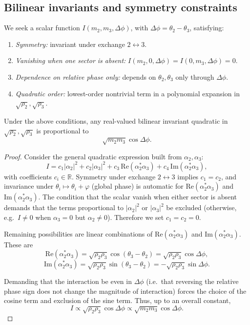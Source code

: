 \documentclass[11pt]{article}
\begin{document}
\subsection{Bilinear invariants and symmetry constraints}

We seek a scalar function \(I(m_2,m_3,\Delta\phi)\), with \(\Delta\phi = \theta_2 - \theta_3\), satisfying:

\begin{enumerate}
\item \emph{Symmetry:} invariant under exchange \(2\leftrightarrow 3\).
\item \emph{Vanishing when one sector is absent:} \(I(m_2,0,\Delta\phi) = I(0,m_3,\Delta\phi) = 0\).
\item \emph{Dependence on relative phase only:} depends on \(\theta_2,\theta_3\) only through \(\Delta\phi\).
\item \emph{Quadratic order:} lowest-order nontrivial term in a polynomial expansion in \(\sqrt{\rho_2},\sqrt{\rho_3}\).
\end{enumerate}

\begin{lemma}
Under the above conditions, any real-valued bilinear invariant quadratic in \(\sqrt{\rho_2},\sqrt{\rho_3}\) is proportional to
\[
\sqrt{m_2 m_3} \cos\Delta\phi.
\]
\end{lemma}

\begin{proof}
Consider the general quadratic expression built from \(\alpha_2,\alpha_3\):
\[
I = c_1 |\alpha_2|^2 + c_2 |\alpha_3|^2 + c_3\,\mathrm{Re}(\alpha_2^*\alpha_3) + c_4\,\mathrm{Im}(\alpha_2^*\alpha_3),
\]
with coefficients \(c_i\in\mathbb{R}\). Symmetry under exchange \(2\leftrightarrow 3\) implies \(c_1 = c_2\), and invariance under \(\theta_i\mapsto \theta_i + \varphi\) (global phase) is automatic for \(\mathrm{Re}(\alpha_2^*\alpha_3)\) and \(\mathrm{Im}(\alpha_2^*\alpha_3)\). The condition that the scalar vanish when either sector is absent demands that the terms proportional to \(|\alpha_2|^2\) or \(|\alpha_3|^2\) be excluded (otherwise, e.g.\ \(I \neq 0\) when \(\alpha_3=0\) but \(\alpha_2\neq 0\)). Therefore we set \(c_1 = c_2 = 0\). 

Remaining possibilities are linear combinations of \(\mathrm{Re}(\alpha_2^*\alpha_3)\) and \(\mathrm{Im}(\alpha_2^*\alpha_3)\). These are
\[
\mathrm{Re}(\alpha_2^*\alpha_3) = \sqrt{\rho_2\rho_3} \cos(\theta_3-\theta_2)
= \sqrt{\rho_2\rho_3} \cos\Delta\phi,
\]
\[
\mathrm{Im}(\alpha_2^*\alpha_3) = \sqrt{\rho_2\rho_3} \sin(\theta_3-\theta_2)
= -\sqrt{\rho_2\rho_3} \sin\Delta\phi.
\]

Demanding that the interaction be even in \(\Delta\phi\) (i.e.\ that reversing the relative phase sign does not change the magnitude of interaction) forces the choice of the cosine term and exclusion of the sine term. Thus, up to an overall constant,
\[
I \propto \sqrt{\rho_2\rho_3}\cos\Delta\phi
\propto \sqrt{m_2 m_3}\cos\Delta\phi.
\]
\end{proof}
\end{document}
